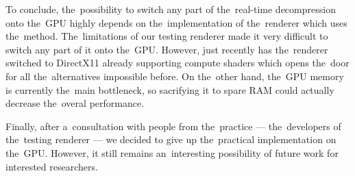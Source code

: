 To conclude, the~possibility to switch any part of the~real-time decompression onto the~GPU highly depends on the~implementation of the~renderer which uses the~method. The~limitations of our testing renderer made it very difficult to switch any part of it onto the~GPU. However, just recently has the~renderer switched to DirectX11 already supporting compute shaders which opens the~door for all the~alternatives impossible before. On the~other hand, the~GPU memory is currently the~main bottleneck, so sacrifying it to spare RAM could actually decrease the~overal performance.

Finally, after a~consultation with people from the~practice --- the~developers of the~testing renderer --- we decided to give up the~practical implementation on the~GPU. However, it still remains an~interesting possibility of future work for interested researchers.
